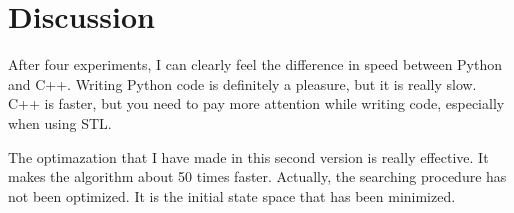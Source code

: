\documentclass[a4paper, 11pt]{article}
\begin{document}
\section{Discussion}
After four experiments, I can clearly feel the difference in speed between Python and C++. Writing Python code is definitely a pleasure, but it is really slow. C++ is faster, but you need to pay more attention while writing code, especially when using STL.

The optimazation that I have made in this second version is really effective. It makes the algorithm about 50 times faster. Actually, the searching procedure has not been optimized. It is the initial state space that has been minimized.

%
%
\end{document}
